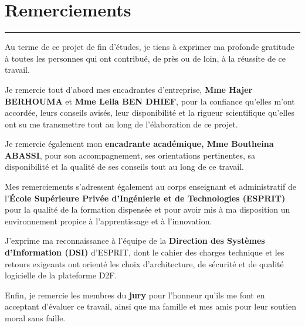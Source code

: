 \documentclass[12pt,a4paper]{report}
\begin{document}
\clearpage
\chapter*{Remerciements}
\thispagestyle{plain}

\vspace*{0.5cm}
\begin{center}
  {\color{espritaccent}\rule{0.3\linewidth}{1.5pt}}
\end{center}
\vspace{0.8cm}

Au terme de ce projet de fin d'études, je tiens à exprimer ma profonde gratitude
à toutes les personnes qui ont contribué, de près ou de loin, à la réussite de ce travail.

\bigskip

Je remercie tout d'abord mes encadrantes d'entreprise, \textbf{Mme Hajer BERHOUMA} et
\textbf{Mme Leila BEN DHIEF}, pour la confiance qu'elles m'ont accordée, leurs
conseils avisés, leur disponibilité et la rigueur scientifique qu'elles ont su
me transmettre tout au long de l'élaboration de ce projet.

Je remercie également mon \textbf{encadrante académique, Mme Boutheina ABASSI}, pour
son accompagnement, ses orientations pertinentes, sa disponibilité et la qualité
de ses conseils tout au long de ce travail.

Mes remerciements s'adressent également au corps enseignant et administratif de
l'\textbf{École Supérieure Privée d'Ingénierie et de Technologies (ESPRIT)} pour
la qualité de la formation dispensée et pour avoir mis à ma disposition un
environnement propice à l'apprentissage et à l'innovation.

J'exprime ma reconnaissance à l'équipe de la \textbf{Direction des Systèmes
d'Information (DSI)} d'ESPRIT, dont le cahier des charges technique et les retours
exigeants ont orienté les choix d'architecture, de sécurité et de qualité logicielle
de la plateforme D2F.

Enfin, je remercie les membres du \textbf{jury} pour l'honneur qu'ils me font en
acceptant d'évaluer ce travail, ainsi que ma famille et mes amis pour leur soutien
moral sans faille.

\clearpage
\end{document}
